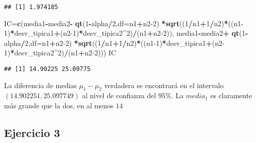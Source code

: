 \documentclass[
]{article}
\newenvironment{Shaded}{\begin{snugshade}}{\end{snugshade}}
\newcommand{\DataTypeTok}[1]{\textcolor[rgb]{0.13,0.29,0.53}{#1}}
\newcommand{\DecValTok}[1]{\textcolor[rgb]{0.00,0.00,0.81}{#1}}
\newcommand{\KeywordTok}[1]{\textcolor[rgb]{0.13,0.29,0.53}{\textbf{#1}}}
\newcommand{\NormalTok}[1]{#1}
\newcommand{\OperatorTok}[1]{\textcolor[rgb]{0.81,0.36,0.00}{\textbf{#1}}}
\newcommand{\StringTok}[1]{\textcolor[rgb]{0.31,0.60,0.02}{#1}}
\begin{document}
\begin{verbatim}
## [1] 1.974185
\end{verbatim}

\begin{Shaded}
\begin{Highlighting}[]
\NormalTok{IC=}\KeywordTok{c}\NormalTok{(media1}\OperatorTok{-}\NormalTok{media2}\OperatorTok{-}\StringTok{ }\KeywordTok{qt}\NormalTok{(}\DecValTok{1}\OperatorTok{-}\NormalTok{alpha}\OperatorTok{/}\DecValTok{2}\NormalTok{,}\DataTypeTok{df=}\NormalTok{n1}\OperatorTok{+}\NormalTok{n2}\DecValTok{-2}\NormalTok{)}
     \OperatorTok{*}\KeywordTok{sqrt}\NormalTok{((}\DecValTok{1}\OperatorTok{/}\NormalTok{n1}\OperatorTok{+}\DecValTok{1}\OperatorTok{/}\NormalTok{n2)}\OperatorTok{*}\NormalTok{((n1}\DecValTok{-1}\NormalTok{)}\OperatorTok{*}\NormalTok{desv_tipica1}\OperatorTok{+}\NormalTok{(n2}\DecValTok{-1}\NormalTok{)}\OperatorTok{*}\NormalTok{desv_tipica2}\OperatorTok{^}\DecValTok{2}\NormalTok{)}\OperatorTok{/}\NormalTok{(n1}\OperatorTok{+}\NormalTok{n2}\DecValTok{-2}\NormalTok{)),}
\NormalTok{     media1}\OperatorTok{-}\NormalTok{media2}\OperatorTok{+}\StringTok{ }\KeywordTok{qt}\NormalTok{(}\DecValTok{1}\OperatorTok{-}\NormalTok{alpha}\OperatorTok{/}\DecValTok{2}\NormalTok{,}\DataTypeTok{df=}\NormalTok{n1}\OperatorTok{+}\NormalTok{n2}\DecValTok{-2}\NormalTok{)}
     \OperatorTok{*}\KeywordTok{sqrt}\NormalTok{((}\DecValTok{1}\OperatorTok{/}\NormalTok{n1}\OperatorTok{+}\DecValTok{1}\OperatorTok{/}\NormalTok{n2)}\OperatorTok{*}\NormalTok{((n1}\DecValTok{-1}\NormalTok{)}\OperatorTok{*}\NormalTok{desv_tipica1}\OperatorTok{+}\NormalTok{(n2}\DecValTok{-1}\NormalTok{)}\OperatorTok{*}\NormalTok{desv_tipica2}\OperatorTok{^}\DecValTok{2}\NormalTok{)}\OperatorTok{/}\NormalTok{(n1}\OperatorTok{+}\NormalTok{n2}\DecValTok{-2}\NormalTok{)))}
\NormalTok{IC}
\end{Highlighting}
\end{Shaded}

\begin{verbatim}
## [1] 14.90225 25.09775
\end{verbatim}

La diferencia de medias \(\mu_1-\mu_2\) verdadera se encontrará en el
intervalo \((14.902251, 25.097749)\) al nivel de confianza del \(95\%\).
La \(media_1\) es claramente más grande que la dos, en al menos \(14\)

\hypertarget{ejercicio-3}{%
\subsection{Ejercicio 3}\label{ejercicio-3}}
\end{document}
